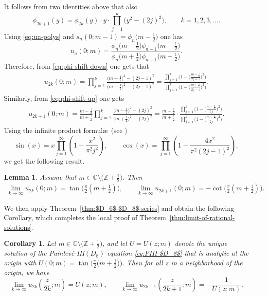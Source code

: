\documentclass[pdftex]{sigma}
\numberwithin{equation}{section}
\newtheorem{Corollary}[Theorem]{Corollary}
\newtheorem{Lemma}[Theorem]{Lemma}
\begin{document}
It follows from two identities above that also
\begin{equation}
\phi_{2k+1}(y)=\phi_{2k}(y)\cdot y\cdot \prod_{j=1}^{k}\big(y^2-(2j)^2\big),\qquad k=1,2,3,\dots.
\label{eq:phi-shift-up}
\end{equation}
Using \eqref{eq:un-polys} and $s_n(0;m-1)=\phi_n\big(m-\frac{1}{2}\big)$ one has
\begin{equation}
\label{eq:u-n-zero-rational}
 u_n(0;m)=\frac{\phi_n\big(m-\tfrac{1}{2}\big)\phi_{n-1}\big(m+\tfrac{1}{2}\big)}{\phi_n\big(m+\tfrac{1}{2}\big)\phi_{n-1}\big(m-\tfrac{1}{2}\big)}.
\end{equation}
Therefore, from \eqref{eq:phi-shift-down} one gets that
\begin{gather}
u_{2k}(0;m)=\prod_{j=1}^k\frac{\big(m-\tfrac{1}{2}\big)^2-(2j-1)^2}{\big(m+\tfrac{1}{2}\big)^2-(2j-1)^2} = \frac{\displaystyle \prod_{j=1}^k \Bigg(1-\bigg(\frac{m-\tfrac{1}{2}}{2j-1}\bigg)^2\Bigg)}{\displaystyle\prod_{j=1}^k\Bigg(1-\bigg(\frac{m+\tfrac{1}{2}}{2j-1}\bigg)^2\Bigg)}.
\label{eq:u-at-zero-even}
\end{gather}
Similarly, from \eqref{eq:phi-shift-up} one gets
\begin{gather}
u_{2k+1}(0;m)=\frac{m-\tfrac{1}{2}}{m+\tfrac{1}{2}}\prod_{j=1}^k\frac{\big(m-\tfrac{1}{2}\big)^2-(2j)^2}{\big(m+\tfrac{1}{2}\big)^2-(2j)^2} = \frac{m-\tfrac{1}{2}}{m+\tfrac{1}{2}}\cdot\frac{\displaystyle\prod_{j=1}^k\Bigg(1-\bigg(\frac{m-\tfrac{1}{2}}{2j}\bigg)^2\Bigg)}{\displaystyle\prod_{j=1}^k\Bigg(1-\bigg(\frac{m+\tfrac{1}{2}}{2j}\bigg)^2\Bigg)}.
\label{eq:u-at-zero-odd}
\end{gather}
Using the infinite product formul\ae\ (see \cite[equations~(4.22.1)--(4.22.2)]{DLMF})
\[
\sin(x)=x\prod_{j=1}^\infty\left(1-\frac{x^2}{\pi^2j^2}\right),\qquad \cos(x)=\prod_{j=1}^\infty\left(1-\frac{4x^2}{\pi^2(2j-1)^2}\right),
\]
we get the following result.
\begin{Lemma} \label{cor:1} Assume that $m\in\mathbb{C}\setminus\big(\mathbb{Z}+\frac{1}{2}\big)$. Then
\begin{gather*}%
\lim_{k\to\infty}u_{2k}(0;m)=
\tan\bigg(\frac{\pi}{2}\left(m+\frac{1}{2}\right)\bigg),\qquad
\lim_{k\to\infty}u_{2k+1}(0;m)=
-\cot\bigg(\frac{\pi}{2}\left(m+\frac{1}{2}\right)\bigg).
\end{gather*}
\end{Lemma}
We then apply Theorem~\ref{thm:$D_6$-$D_8$-series} and obtain the following Corollary, which completes the local proof of Theorem~\ref{thm:limit-of-rational-solutions}.
\begin{Corollary}\label{cor:local-limit-of-rational-solutions}
Let $m\in\mathbb{C}\setminus\big(\mathbb{Z}+\tfrac{1}{2}\big)$, and let $U=U(z;m)$ denote the unique solution of the Painlev\'e-III$(D_8)$ equation \eqref{eq:PIII-$D_8$} that is analytic at the origin with $U(0;m)=\tan\big(\frac{\pi}{2}\big(m+\frac{1}{2}\big)\big)$. Then for all $z$ in a neighborhood of the origin, we have
\[
\lim_{k\to\infty} u_{2k}\left(\dfrac{z}{2k};m\right)=U(z;m),
\qquad
\lim_{k\to\infty} u_{2k+1}\left(\dfrac{z}{2k+1};m\right)=-\frac{1}{U(z;m)}.
\]
\end{Corollary}
\end{document}
